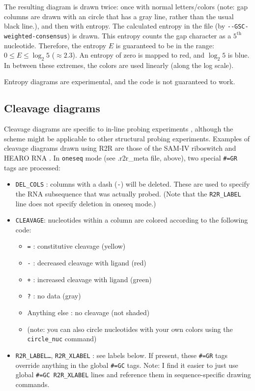 \documentclass[letterpaper,12pt]{report}
\begin{document}
The resulting diagram is drawn twice: once with normal letters/colors
(note: gap columns are drawn with an circle that has a gray line,
rather than the usual black line.), and then with entropy.  The
calculated entropy in the file (by {\tt -{}-GSC-weighted-consensus}) is drawn.  This
entropy counts the gap character as a $5^{\text{th}}$ nucleotide.
 Therefore, the entropy $E$ is guaranteed to be in the range:  $0 \leq E
\leq \log_{2} 5$ ($\approx 2.3$).  An entropy of zero is
mapped to red, and $\log_{2} 5$ is blue.  In between these
extremes, the colors are used linearly (along the log scale).

Entropy diagrams are experimental, and the code is not guaranteed
to work.

\subsection{Cleavage diagrams}
\label{cleavage}

Cleavage diagrams are specific to in-line probing 
experiments \cite{inlines}, although the scheme might be applicable
to other structural probing experiments.
Examples of cleavage diagrams drawn using R2R are
those of the SAM-IV riboswitch \cite[Fig. 2(A)]{SAMIV} and HEARO RNA \cite[Supplementary Fig. 8(b)]{CoolRNAs}.
In {\tt oneseq} mode (see .r2r\_meta file,
above), two special {\tt \#=GR} tags are processed:

\begin{itemize}
\item {\tt DEL\_COLS} : columns with a dash
({\tt -}) will be deleted.  These are used to
specify the RNA subsequence that was actually probed.  (Note that the
{\tt R2R\_LABEL} line does not specify deletion in oneseq mode.)
\item {\tt CLEAVAGE}: nucleotides within a column are colored according to the
following code:

\begin{itemize}
\item {\tt =}  : constitutive cleavage (yellow)
\item {\tt -}  :  decreased cleavage with ligand (red)
\item {\tt +} : increased cleavage with ligand (green)
\item {\tt ?} : no data (gray)
\item Anything else : no cleavage (not shaded)
\item (note: you can also circle nucleotides with your own colors using
the {\tt circle\_nuc} command)
\end{itemize}
\item {\tt R2R\_LABEL{\dots}}, {\tt R2R\_XLABEL} : see labels below.  If present,
these {\tt \#=GR} tags override anything in the global {\tt \#=GC} tags.
Note: I find it easier to just use global {\tt \#=GC R2R\_XLABEL} lines and reference them in sequence-specific drawing commands.

\end{itemize}
\end{document}
